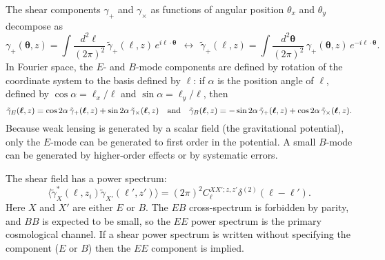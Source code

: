 The shear components $\gamma_+$ and $\gamma_\times$ as functions of angular position $\theta_x$ and $\theta_y$ decompose as
\begin{equation}
\gamma_+({\boldsymbol\theta},z) = \int \frac{d^2\boldsymbol\ell}{(2\pi)^2} \,\tilde\gamma_+({\boldsymbol\ell},z) \,e^{i{\boldsymbol\ell}\cdot{\boldsymbol\theta}}
~~\leftrightarrow~~
\tilde\gamma_+({\boldsymbol\ell},z) = \int \frac{d^2\boldsymbol\theta}{(2\pi)^2} \,\gamma_+({\boldsymbol\theta},z) \,e^{-i{\boldsymbol\ell}\cdot{\boldsymbol\theta}}.
\end{equation}
In Fourier space, the $E$- and $B$-mode components are defined by rotation of the coordinate system to the basis defined by ${\boldsymbol\ell}$: if $\alpha$ is the position angle of ${\boldsymbol\ell}$, defined by $\cos\alpha = \ell_x/\ell$ and $\sin\alpha = \ell_y/\ell$, then
\begin{equation}
\tilde \gamma_E({\boldsymbol\ell},z) = \cos 2\alpha\,\tilde\gamma_+({\boldsymbol\ell},z) + \sin2\alpha\,\tilde\gamma_\times({\boldsymbol\ell},z)
~~~{\rm and}~~~
\tilde \gamma_B({\boldsymbol\ell},z) = -\sin 2\alpha\,\tilde\gamma_+({\boldsymbol\ell},z) + \cos 2\alpha\,\tilde\gamma_\times({\boldsymbol\ell},z).
\end{equation}
Because weak lensing is generated by a scalar field (the gravitational potential), only the $E$-mode can be generated to first order in the potential. A small $B$-mode can be generated by higher-order effects \citep[e.g.][]{2002A&A...389..729S, 2002ApJ...574...19C, 2010A&A...523A..28K} or by systematic errors.

The shear field has a power spectrum:
\begin{equation}
\langle \tilde\gamma_X^\ast({\boldsymbol\ell},z_i) \tilde\gamma_{X'}({\boldsymbol\ell}',z') \rangle = (2\pi)^2 C_\ell^{XX';z,z'} \delta^{(2)}({\boldsymbol\ell}-{\boldsymbol\ell}').
\end{equation}
Here $X$ and $X'$ are either $E$ or $B$. The $EB$ cross-spectrum is forbidden by parity, and $BB$ is expected to be small, so the $EE$ power spectrum is the primary cosmological channel. If a shear power spectrum is written without specifying the component ($E$ or $B$) then the $EE$ component is implied.

